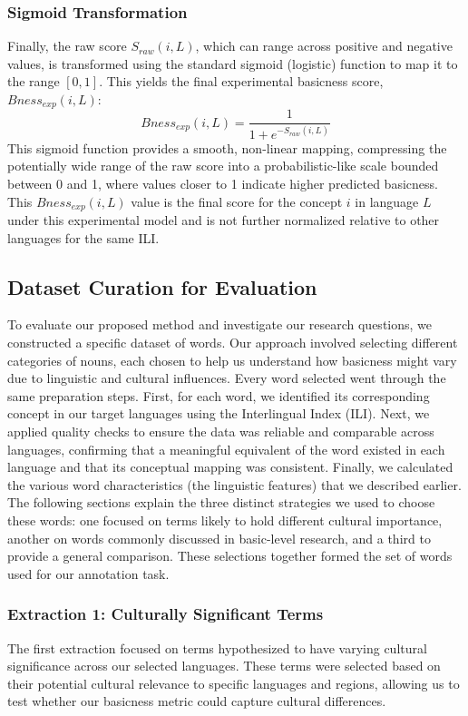 \documentclass[preprint,12pt,authoryear]{elsarticle}
\begin{document}
\subsubsection{Sigmoid Transformation}
Finally, the raw score $S_{raw}(i, L)$, which can range across positive and negative values, is transformed using the standard sigmoid (logistic) function to map it to the range $[0, 1]$. This yields the final experimental basicness score, $Bness_{exp}(i, L)$:
\[ \label{eq:sigmoid}
Bness_{exp}(i, L) = \frac{1}{1 + e^{-S_{raw}(i, L)}}
\]
This sigmoid function provides a smooth, non-linear mapping, compressing the potentially wide range of the raw score into a probabilistic-like scale bounded between 0 and 1, where values closer to 1 indicate higher predicted basicness. This $Bness_{exp}(i, L)$ value is the final score for the concept $i$ in language $L$ under this experimental model and is not further normalized relative to other languages for the same ILI.

\subsection{Dataset Curation for Evaluation}

To evaluate our proposed method and investigate our research questions, we constructed a specific dataset of words. Our approach involved selecting different categories of nouns, each chosen to help us understand how basicness might vary due to linguistic and cultural influences. Every word selected went through the same preparation steps. First, for each word, we identified its corresponding concept in our target languages using the Interlingual Index (ILI). Next, we applied quality checks to ensure the data was reliable and comparable across languages, confirming that a meaningful equivalent of the word existed in each language and that its conceptual mapping was consistent. Finally, we calculated the various word characteristics (the linguistic features) that we described earlier. The following sections explain the three distinct strategies we used to choose these words: one focused on terms likely to hold different cultural importance, another on words commonly discussed in basic-level research, and a third to provide a general comparison. These selections together formed the set of words used for our annotation task.

\subsubsection{Extraction 1: Culturally Significant Terms}
\label{sec:ex1}
The first extraction focused on terms hypothesized to have varying cultural significance across our selected languages. These terms were selected based on their potential cultural relevance to specific languages and regions, allowing us to test whether our basicness metric could capture cultural differences.
\end{document}
